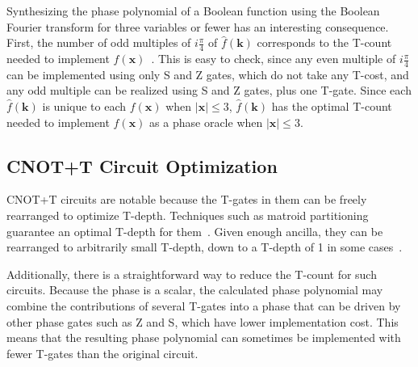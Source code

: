 Synthesizing the phase polynomial of a Boolean function using the Boolean Fourier
transform for three variables or fewer has an interesting consequence. First, the
number of odd multiples of $i\frac{\pi}{4}$ of $\hat{f}(\mathbf{k})$ corresponds to
the T-count needed to implement $f(\mathbf{x})$~\cite{bib-amy-rm}. This is easy to
check, since any even multiple of $i\frac{\pi}{4}$ can be implemented using only
S and Z gates, which do not take any T-cost, and any odd multiple can be realized
using S and Z gates, plus one T-gate. Since each $\hat{f}(\mathbf{k})$
is unique to each $f(\mathbf{x})$ when $|\mathbf{x}| \leq 3$,
$\hat{f}(\mathbf{k})$ has the optimal T-count needed to implement
$f(\mathbf{x})$ as a phase oracle when $|\mathbf{x}| \leq 3$.



\subsection{CNOT+T Circuit Optimization}
\label{Mot:CnotOpt}
CNOT+T circuits are notable because the T-gates in them can be freely rearranged to optimize T-depth.
Techniques such as matroid partitioning guarantee an optimal T-depth
for them~\cite{bib-amy-matroid}. Given enough ancilla, they can be rearranged to
arbitrarily small T-depth, down to a T-depth of 1 in some cases~\cite{bib-selinger-tdepth}.

Additionally, there is a straightforward way to reduce the T-count for such circuits.
Because the phase is a scalar, the calculated phase polynomial may combine the contributions of
several T-gates into a phase that can be driven by other phase gates such as Z and S, which
have lower implementation cost. This means that the resulting phase polynomial can sometimes be
implemented with fewer T-gates than the original circuit.

